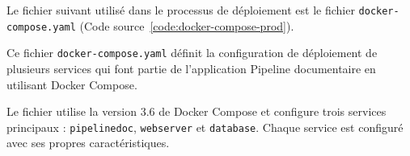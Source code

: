 Le fichier suivant utilisé dans le processus de déploiement est le fichier \Verb|docker-compose.yaml| (Code source~\ref{code:docker-compose-prod}).


Ce fichier \Verb|docker-compose.yaml| définit la configuration de déploiement de plusieurs services qui font partie de l'application Pipeline documentaire en utilisant Docker Compose.

Le fichier utilise la version 3.6 de Docker Compose et configure trois services principaux : \Verb|pipelinedoc|, \Verb|webserver| et \Verb|database|. Chaque service est configuré avec ses propres caractéristiques.

